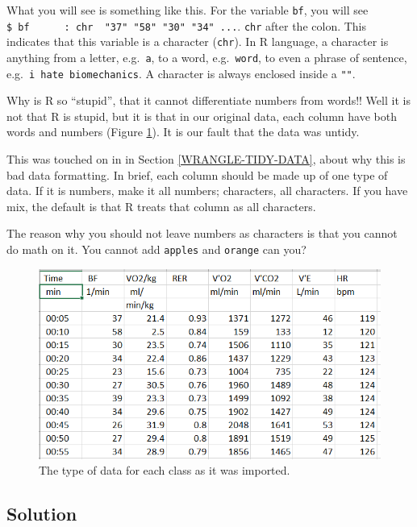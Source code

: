\documentclass[
]{book}
\begin{document}
What you will see is something like this. For the variable \texttt{bf}, you will see \texttt{\$\ bf\ \ \ \ \ \ :\ chr\ \ "37"\ "58"\ "30"\ "34"\ ...}. \texttt{chr} after the colon. This indicates that this variable is a character (\texttt{chr}). In R language, a character is anything from a letter, e.g.~\texttt{a}, to a word, e.g.~\texttt{word}, to even a phrase of sentence, e.g.~\texttt{i\ hate\ biomechanics}. A character is always enclosed inside a \texttt{""}.

Why is R so ``stupid'', that it cannot differentiate numbers from words!! Well it is not that R is stupid, but it is that in our original data, each column have both words and numbers (Figure \ref{fig:col-class}). It is our fault that the data was untidy.

This was touched on in in Section \ref{WRANGLE-TIDY-DATA}, about why this is bad data formatting. In brief, each column should be made up of one type of data. If it is numbers, make it all numbers; characters, all characters. If you have mix, the default is that R treats that column as all characters.

The reason why you should not leave numbers as characters is that you cannot do math on it. You cannot add \texttt{apples} and \texttt{orange} can you?

\begin{figure}
\includegraphics[width=1\linewidth]{images/chapter-5/dat_vo2_column_class} \caption{The type of data for each class as it was imported.}\label{fig:col-class}
\end{figure}

\hypertarget{solution-2}{%
\subsection{Solution}\label{solution-2}}
\end{document}
